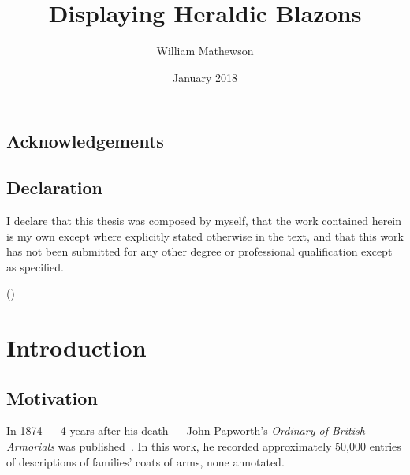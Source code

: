 \documentclass[nobib, a4paper, twoside, justified]{tufte-book}
\title{Displaying Heraldic Blazons}
\author{William Mathewson}
\date{January 2018}
\begin{document}
\frontmatter

\maketitlepage


\begin{publicationmeta}
  \section*{Acknowledgements}

  \section*{Declaration}
  I declare that this thesis was composed by myself,
  that the work contained herein is my own
  except where explicitly stated otherwise in the text,
  and that this work has not been submitted for any other degree or
  professional qualification except as specified.\par
  ({\textit \thanklessauthor})
\end{publicationmeta}

\tableofcontents


\mainmatter

\chapter{Introduction}\label{cha:introduction}

\section{Motivation}\label{sec:motivation}

In 1874 --- 4 years after his death --- John Papworth's \textit{Ordinary of British Armorials} was
published~\autocite{collins_1942}. In this work, he recorded approximately 50,000 entries of
descriptions of families' coats of arms, none annotated.
\end{document}
